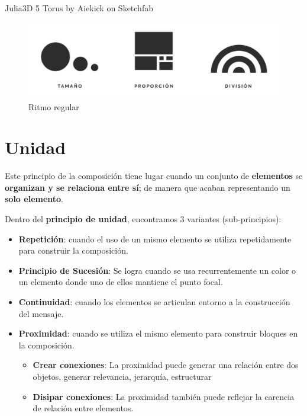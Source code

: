 \documentclass[16pt,]{krantz}
\theoremstyle{definition}
\theoremstyle{definition}
\theoremstyle{definition}
\theoremstyle{definition}
\theoremstyle{remark}
\begin{document}
Julia3D 5 Torus by Aiekick on Sketchfab

\begin{figure}

{\centering \includegraphics[width=1\linewidth,height=1\textheight]{proporcion} 

}

\caption{Ritmo regular}\label{fig:proporcion}
\end{figure}

\hypertarget{unidad}{%
\section{Unidad}\label{unidad}}

Este principio de la composición tiene lugar cuando un conjunto de \textbf{elementos} se \textbf{organizan y se relaciona entre sí}; de manera que acaban representando un \textbf{solo elemento}.

Dentro del \textbf{principio de unidad}, encontramos 3 variantes (sub-principios):

\begin{itemize}
\item
  \textbf{Repetición}: cuando el uso de un mismo elemento se utiliza repetidamente para construir la composición.
\item
  \textbf{Principio de Sucesión}: Se logra cuando se usa recurrentemente un color o un elemento donde uno de ellos mantiene el punto focal.
\item
  \textbf{Continuidad}: cuando los elementos se articulan entorno a la construcción del mensaje.
\item
  \textbf{Proximidad}: cuando se utiliza el mismo elemento para construir bloques en la composición.

  \begin{itemize}
  \item
    \textbf{Crear conexiones}: La proximidad puede generar una relación entre dos objetos, generar relevancia, jerarquía, estructurar
  \item
    \textbf{Disipar conexiones}: La proximidad también puede reflejar la carencia de relación entre elementos.
  \end{itemize}
\end{itemize}
\end{document}
